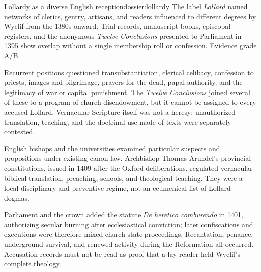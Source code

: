 \begin{heresydossier}{Lollardy as a diverse English reception}{dossier:lollardy}
\objectfield The label \emph{Lollard} named networks of clerics, gentry, artisans, and readers influenced to different degrees by Wyclif from the 1380s onward. Trial records, manuscript books, episcopal registers, and the anonymous \emph{Twelve Conclusions} presented to Parliament in 1395 show overlap without a single membership roll or confession. Evidence grade A/B.

\propositionfield Recurrent positions questioned transubstantiation, clerical celibacy, confession to priests, images and pilgrimage, prayers for the dead, papal authority, and the legitimacy of war or capital punishment. The \emph{Twelve Conclusions} joined several of these to a program of church disendowment, but it cannot be assigned to every accused Lollard. Vernacular Scripture itself was not a heresy; unauthorized translation, teaching, and the doctrinal use made of texts were separately contested.

\responsefield English bishops and the universities examined particular suspects and propositions under existing canon law. Archbishop Thomas Arundel's provincial constitutions, issued in 1409 after the Oxford deliberations, regulated vernacular biblical translation, preaching, schools, and theological teaching. They were a local disciplinary and preventive regime, not an ecumenical list of Lollard dogmas.

\aftermathfield Parliament and the crown added the statute \emph{De heretico comburendo} in 1401, authorizing secular burning after ecclesiastical conviction; later confiscations and executions were therefore mixed church-state proceedings. Recantation, penance, underground survival, and renewed activity during the Reformation all occurred. Accusation records must not be read as proof that a lay reader held Wyclif's complete theology.
\end{heresydossier}

